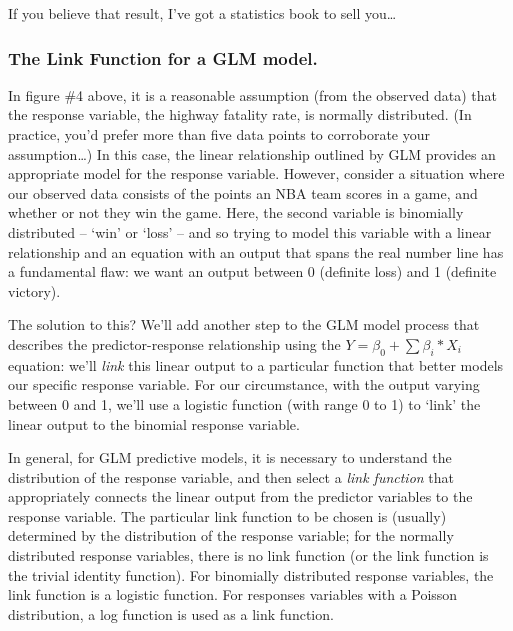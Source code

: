 \documentclass[12pt]{article}
\begin{document}

If you believe that result, I've got a statistics book to sell you\dots

\subsubsection{The Link Function for a GLM model.}

In figure \#4 above, it is a reasonable assumption (from the observed data) that the response variable, the highway fatality rate, is normally 
distributed.  (In practice, you'd prefer more than five data points to corroborate your assumption\dots)  In this case, the linear relationship
outlined by GLM provides an appropriate model for the response variable.  However, consider a situation where our observed data consists of the 
points an NBA team scores in a game, and whether or not they win the game.  Here, the second variable is binomially distributed -- `win' or `loss' 
-- and so trying to model this variable with a linear relationship and an equation with an output that spans the real number line has a fundamental
flaw:  we want an output between 0 (definite loss) and 1 (definite victory).


The solution to this?  We'll add another step to the GLM model process that describes the predictor-response relationship using the 
$Y=\beta_0 + \sum \beta_i*X_i$ equation:  we'll \textit{link} this linear output to a particular function that better models our specific response
variable.  For our circumstance, with the output varying between 0 and 1, we'll use a logistic function (with range 0 to 1) to `link' the linear 
output to the binomial response variable.  


In general, for GLM predictive models, it is necessary to understand the distribution of the response variable, and then select a
\textit{link function} that appropriately connects the linear output from the predictor variables to the response variable.  The particular
link function to be chosen is (usually) determined by the distribution of the response variable; for the normally distributed response variables,
there is no link function (or the link function is the trivial identity function).  For binomially distributed response variables, the link 
function is a logistic function.  For responses variables with a Poisson distribution, a log function is used as a link function.
\end{document}
